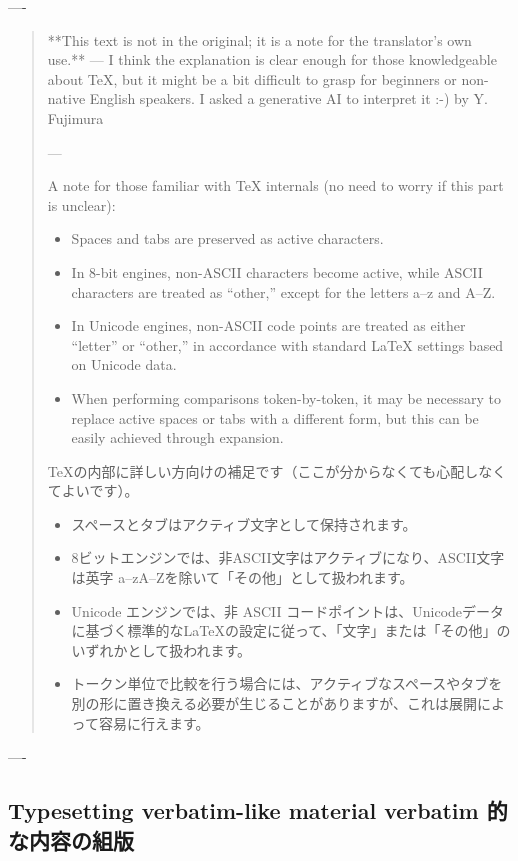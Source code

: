 \documentclass{ltxguide}
\DeclareRobustCommand{\jpquote}[1]{「#1」}
\begin{document}
----
\begin{quote}\color{blue}
**This text is not in the original; it is a note for the translator's own use.** ---
I think the explanation is clear enough for those knowledgeable about \TeX{}, but it might be a bit difficult to grasp for beginners or non-native English speakers. I asked a generative AI to interpret it :-) by Y. Fujimura

---

 A note for those familiar with \TeX{} internals (no need to worry if this part is unclear):

\begin{itemize}
\item
Spaces and tabs are preserved as active characters.
\item
 In 8-bit engines, non-ASCII characters become active,
 while ASCII characters are treated as \enquote{other,} except for the letters a–z and A–Z.
\item
 In Unicode engines, non-ASCII code points are treated as either
 \enquote{letter} or \enquote{other,} in accordance with standard LaTeX settings
 based on Unicode data.
\item
 When performing comparisons token-by-token, it may be necessary
 to replace active spaces or tabs with a different form,
 but this can be easily achieved through expansion.
\end{itemize}

\TeX{}の内部に詳しい方向けの補足です（ここが分からなくても心配しなくてよいです）。

\begin{itemize}
\item
スペースとタブはアクティブ文字として保持されます。
\item
8ビットエンジンでは、非ASCII文字はアクティブになり、ASCII文字は英字 a--zA--Zを除いて\jpquote{その他}として扱われます。
\item
Unicode エンジンでは、非 ASCII コードポイントは、Unicodeデータに基づく標準的な\LaTeX{}の設定に従って、\jpquote{文字}または\jpquote{その他}のいずれかとして扱われます。
\item
トークン単位で比較を行う場合には、アクティブなスペースやタブを別の形に置き換える必要が生じることがありますが、これは展開によって容易に行えます。
\end{itemize}
\end{quote}

----

\subsection{Typesetting verbatim-like material
verbatim 的な内容の組版}
\end{document}
